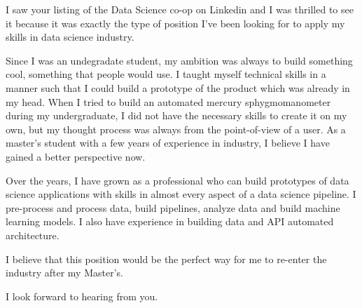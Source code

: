 I saw your listing of the Data Science co-op on Linkedin and I was thrilled to see it because it was exactly the type of position I've been looking for to apply my skills in data science industry.

Since I was an undegradate student, my ambition was always to build something cool, something that people would use. I taught myself technical skills in a manner such that I could build a prototype of the product which was already in my head. When I tried to build an automated mercury sphygmomanometer during my undergraduate, I did not have the necessary skills to create it on my own, but my thought process was always from the point-of-view of a user. As a master's student with a few years of experience in industry, I believe I have gained a better perspective now.

Over the years, I have grown as a professional who can build prototypes of data science applications with skills in almost every aspect of a data science pipeline. I pre-process and process data, build pipelines, analyze data and build machine learning models. I also have experience in building data and API automated architecture. 

I believe that this position would be the perfect way for me to re-enter the industry after my Master's. 

I look forward to hearing from you.